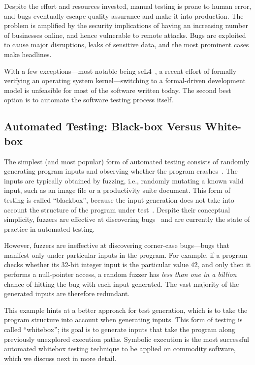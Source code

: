 Despite the effort and resources invested, manual testing is prone to human error, and bugs eventually escape quality assurance and make it into production.  The problem is amplified by the security implications of having an increasing number of businesses online, and hence vulnerable to remote attacks.  Bugs are exploited to cause major disruptions, leaks of sensitive data, and the most prominent cases make headlines.

With a few exceptions---most notable being seL4~\cite{seL4}, a recent effort of formally verifying an operating system kernel---switching to a formal-driven development model is unfeasible for most of the software written today.
%
The second best option is to automate the software testing process itself.


\subsection{Automated Testing: Black-box Versus White-box}

The simplest (and most popular) form of automated testing consists of randomly generating program inputs and observing whether the program crashes~\cite{quickcheck}.  The inputs are typically obtained by fuzzing, i.e., randomly mutating a known valid input, such as an image file or a productivity suite document.
%
This form of testing is called ``blackbox'', because the input generation does not take into account the structure of the program under test~\cite{blackbox-testing}.
%
Despite their conceptual simplicity, fuzzers are effective at discovering bugs~\cite{afl,autodafe,skipfish} and are currently the state of practice in automated testing.

However, fuzzers are ineffective at discovering corner-case bugs---bugs that manifest only under particular inputs in the program.
%
For example, if a program checks whether its 32-bit integer input is the particular value 42, and only then it performs a null-pointer access, a random fuzzer has \emph{less than one in a billion} chance of hitting the bug with each input generated.
%
The vast majority of the generated inputs are therefore redundant.

This example hints at a better approach for test generation, which is to take the program structure into account when generating inputs.  This form of testing is called ``whitebox''; its goal is to generate inputs that take the program along previously unexplored execution paths.
%
Symbolic execution is the most successful automated whitebox testing technique to be applied on commodity software, which we discuss next in more detail.

